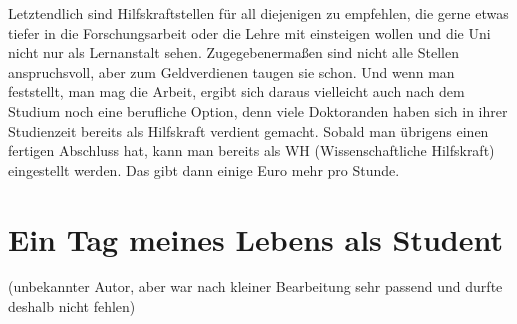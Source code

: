 Letztendlich sind Hilfskraftstellen für all diejenigen zu empfehlen, die gerne etwas tiefer in die Forschungsarbeit oder die Lehre mit einsteigen wollen und die Uni nicht nur als Lernanstalt sehen. Zugegebenermaßen sind nicht alle Stellen anspruchsvoll, aber zum Geldverdienen taugen sie schon. Und wenn man feststellt, man mag die Arbeit, ergibt sich daraus vielleicht auch nach dem Studium noch eine berufliche Option, denn viele Doktoranden haben sich in ihrer Studienzeit bereits als Hilfskraft verdient gemacht. Sobald man übrigens einen fertigen Abschluss hat, kann man bereits als WH (Wissenschaftliche Hilfskraft) eingestellt werden. Das gibt dann einige Euro mehr pro Stunde. 

\newpage

\section{Ein Tag meines Lebens als Student}
(unbekannter Autor, aber war nach kleiner Bearbeitung sehr passend und durfte deshalb nicht fehlen)\\
